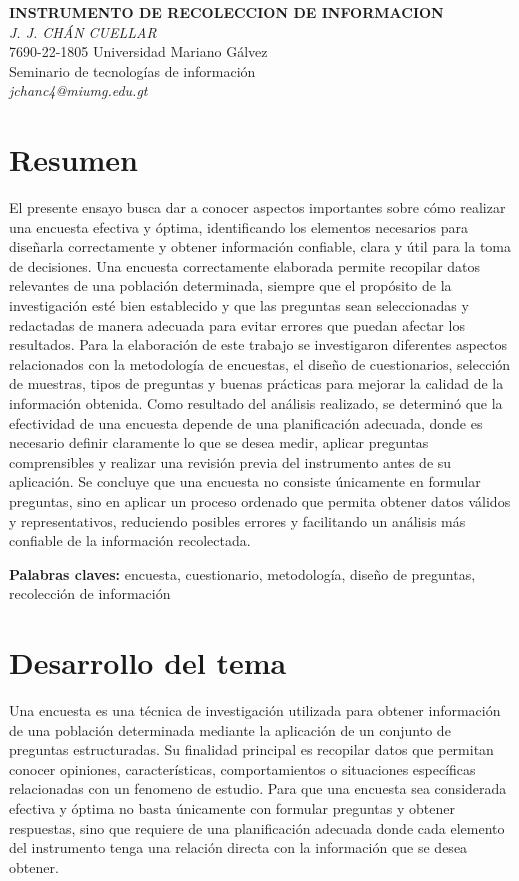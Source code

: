 \documentclass[12pt,letterpaper]{article}
\begin{document}
\begin{center}
    {\large\textbf{INSTRUMENTO DE RECOLECCION DE INFORMACION}} \\[1.5ex]
    \textit{J. J. CHÁN CUELLAR } \\[1.5ex]
    7690-22-1805 \quad Universidad Mariano Gálvez \\[1.0ex]
    Seminario de tecnologías de información \\[1.0ex]
    \textit{jchanc4@miumg.edu.gt}
\end{center}
\vspace{1em}
\section*{Resumen}
El presente ensayo busca dar a conocer aspectos importantes sobre cómo realizar una encuesta efectiva y óptima, identificando los elementos necesarios para diseñarla correctamente y obtener información confiable, clara y útil para la toma de decisiones. Una encuesta correctamente elaborada permite recopilar datos relevantes de una población determinada, siempre que el propósito de la investigación esté bien establecido y que las preguntas sean seleccionadas y redactadas de manera adecuada para evitar errores que puedan afectar los resultados. Para la elaboración de este trabajo se investigaron diferentes aspectos relacionados con la metodología de encuestas, el diseño de cuestionarios, selección de muestras, tipos de preguntas y buenas prácticas para mejorar la calidad de la información obtenida. Como resultado del análisis realizado, se determinó que la efectividad de una encuesta depende de una planificación adecuada, donde es necesario definir claramente lo que se desea medir, aplicar preguntas comprensibles y realizar una revisión previa del instrumento antes de su aplicación. Se concluye que una encuesta no consiste únicamente en formular preguntas, sino en aplicar un proceso ordenado que permita obtener datos válidos y representativos, reduciendo posibles errores y facilitando un análisis más confiable de la información recolectada.


\vspace{1em}

\noindent\textbf{Palabras claves:} encuesta, cuestionario, metodología, diseño de preguntas, recolección de información
\vspace{1em}

\section*{Desarrollo del tema}
Una encuesta es una técnica de investigación utilizada para obtener información de una población determinada mediante la aplicación de un conjunto de preguntas estructuradas. Su finalidad principal es recopilar datos que permitan conocer opiniones, características, comportamientos o situaciones específicas relacionadas con un fenomeno de estudio. Para que una encuesta sea considerada efectiva y óptima no basta únicamente con formular preguntas y obtener respuestas, sino que requiere de una planificación adecuada donde cada elemento del instrumento tenga una relación directa con la información que se desea obtener.
\end{document}
